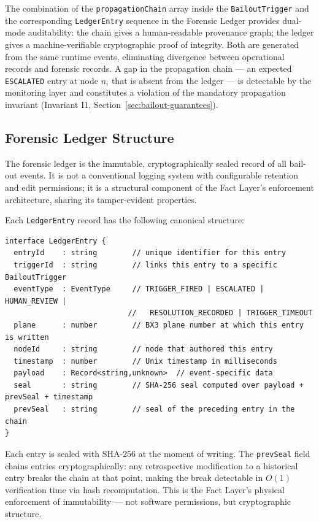\documentclass[12pt]{article}
\begin{document}
The combination of the \texttt{propagationChain} array inside the \texttt{BailoutTrigger} and the corresponding \texttt{LedgerEntry} sequence in the Forensic Ledger provides dual-mode auditability: the chain gives a human-readable provenance graph; the ledger gives a machine-verifiable cryptographic proof of integrity. Both are generated from the same runtime events, eliminating divergence between operational records and forensic records. A gap in the propagation chain --- an expected \texttt{ESCALATED} entry at node $n_i$ that is absent from the ledger --- is detectable by the monitoring layer and constitutes a violation of the mandatory propagation invariant (Invariant I1, Section~\ref{sec:bailout-guarantees}).

\subsection{Forensic Ledger Structure}
\label{sec:forensic-ledger}

The forensic ledger is the immutable, cryptographically sealed record of all bail-out events. It is not a conventional logging system with configurable retention and edit permissions; it is a structural component of the Fact Layer's enforcement architecture, sharing its tamper-evident properties.

Each \texttt{LedgerEntry} record has the following canonical structure:

\begin{verbatim}
interface LedgerEntry {
  entryId    : string        // unique identifier for this entry
  triggerId  : string        // links this entry to a specific BailoutTrigger
  eventType  : EventType     // TRIGGER_FIRED | ESCALATED | HUMAN_REVIEW |
                            //   RESOLUTION_RECORDED | TRIGGER_TIMEOUT
  plane      : number        // BX3 plane number at which this entry is written
  nodeId     : string        // node that authored this entry
  timestamp  : number        // Unix timestamp in milliseconds
  payload    : Record<string,unknown>  // event-specific data
  seal       : string        // SHA-256 seal computed over payload + prevSeal + timestamp
  prevSeal   : string        // seal of the preceding entry in the chain
}
\end{verbatim}

Each entry is sealed with SHA-256 at the moment of writing. The \texttt{prevSeal} field chains entries cryptographically: any retrospective modification to a historical entry breaks the chain at that point, making the break detectable in $O(1)$ verification time via hash recomputation. This is the Fact Layer's physical enforcement of immutability --- not software permissions, but cryptographic structure.
\end{document}
